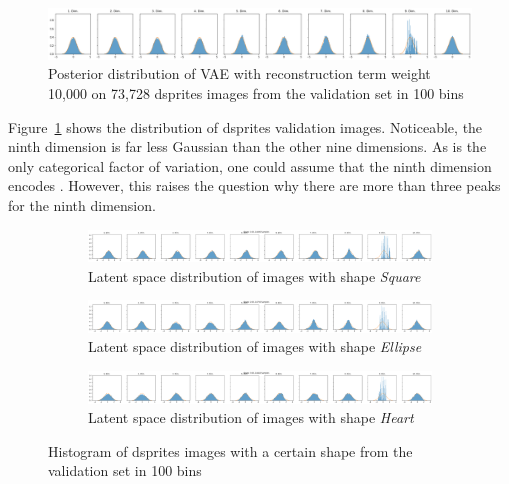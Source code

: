 \begin{figure}
    \centering
    \includegraphics[width=\textwidth]{images/latent_space_entanglement/vae_dsprites_lf_10000_dist.png}
    \caption[VAE Latent Space Distribution - dsprites]{Posterior distribution of \ac{VAE} with reconstruction term weight 10,000 on 73,728 dsprites images from the validation set in 100 bins}
    \label{fig:10000_vae_latent_space_distribution}
\end{figure}

Figure~\ref{fig:10000_vae_latent_space_distribution} shows the distribution of dsprites validation images.
Noticeable, the ninth dimension is far less Gaussian than the other nine dimensions.
As  is the only categorical factor of variation, one could assume that the ninth dimension encodes .
However, this raises the question why there are more than three peaks for the ninth dimension.

\begin{figure}
    \centering
    \begin{subfigure}{\textwidth}
        \centering
        \includegraphics[width=\textwidth]{images/latent_space_entanglement/vae_dsprites_lf_10000_dist_shape_1.png}
        \caption{Latent space distribution of images with shape \textit{Square}}
    \end{subfigure}
    \begin{subfigure}{\textwidth}
        \centering
        \includegraphics[width=\textwidth]{images/latent_space_entanglement/vae_dsprites_lf_10000_dist_shape_2.png}
        \caption{Latent space distribution of images with shape \textit{Ellipse}}
    \end{subfigure}
    \begin{subfigure}{\textwidth}
        \centering
        \includegraphics[width=\textwidth]{images/latent_space_entanglement/vae_dsprites_lf_10000_dist_shape_3.png}
        \caption{Latent space distribution of images with shape \textit{Heart}}
    \end{subfigure}
    \caption[VAE Latent Space Distribution - dsprites Shapes]{Histogram of dsprites images with a certain shape from the validation set in 100 bins}
    \label{fig:10000_vae_latent_space_distribution_shapes}
\end{figure}

